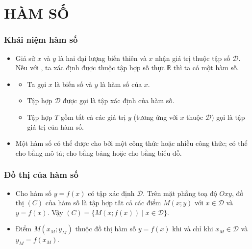 \section{HÀM SỐ}
\subsubsection{Khái niệm hàm số}
\begin{itemize}
	\item [\iconMT]  Giả sử $x$ và $y$ là hai đại lượng biến thiên và $x$ nhận giá trị thuộc tập số $\mathscr{D}$.	Nếu với , ta xác định được  thuộc tập hợp số thực $\mathbb{R}$ thì ta có một hàm số.
	\item [\iconMT] 
	\begin{boxkn}
		\begin{itemize}
			\item Ta gọi $x$ là biến số và $y$ là hàm số của $x$.
			\item Tập hợp $\mathscr{D}$ được gọi là tập xác định của hàm số.
			\item Tập hợp $T$ gồm tất cả các giá trị $y$ (tương ứng với $x$ thuộc $\mathscr{D}$) gọi là tập giá trị của hàm số.
		\end{itemize}
	\end{boxkn}
	\item [\iconMT]  Một hàm số có thể được cho bởi một công thức hoặc nhiều công thức; có thể cho bằng mô tả; cho bằng bảng hoặc cho bằng biểu đồ.
\end{itemize}

\subsubsection{Đồ thị của hàm số}
\begin{itemize}
	\item [\iconMT]  Cho hàm số $y=f(x)$ có tập xác định $\mathscr{D}$. Trên mặt phẳng toạ độ $Oxy$, đồ thị $(C)$ của hàm số là tập hợp tất cả các điểm $M(x;y)$ với $x \in \mathscr{D}$ và $y=f(x)$. Vậy $(C)=\{M(x;f(x)) \mid x \in \mathscr{D}\}$.
	\item [\iconMT]  Điểm $M\left(x_{M};y_{M}\right)$ thuộc đồ thị hàm số $y=f(x)$ khi và chỉ khi $x_{M} \in \mathscr{D}$ và $y_{M}=f\left(x_{M}\right)$.
\end{itemize}
